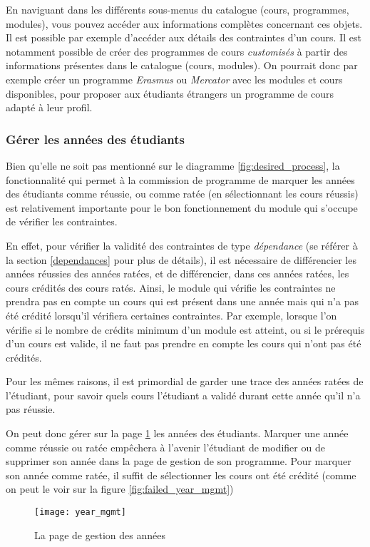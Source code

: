 En naviguant dans les différents sous-menus du catalogue (cours, programmes, modules), vous pouvez accéder aux informations complètes concernant ces objets. Il est possible par exemple d'accéder aux détails des contraintes d'un cours. Il est notamment possible de créer des programmes de cours \textit{customisés} à partir des informations présentes dans le catalogue (cours, modules). On pourrait donc par exemple créer un programme \textit{Erasmus} ou \textit{Mercator} avec les modules et cours disponibles, pour proposer aux étudiants étrangers un programme de cours adapté à leur profil.

\subsubsection{Gérer les années des étudiants}
\label{year_mgmt}
Bien qu'elle ne soit pas mentionné sur le diagramme \ref{fig:desired_process}, la fonctionnalité qui permet à la commission de programme de marquer les années des étudiants comme réussie, ou comme ratée (en sélectionnant les cours réussis) est relativement importante pour le bon fonctionnement du module qui s'occupe de vérifier les contraintes. 


En effet, pour vérifier la validité des contraintes de type \textit{dépendance} (se référer à  la section \ref{dependances} pour plus de détails), il est nécessaire de différencier les années réussies des années ratées, et de différencier, dans ces années ratées, les cours crédités des cours ratés. Ainsi, le module qui vérifie les contraintes ne prendra pas en compte un cours qui est présent dans une année mais qui n'a pas été crédité lorsqu'il vérifiera certaines contraintes. Par exemple, lorsque l'on vérifie si le nombre de crédits minimum d'un module est atteint, ou si le prérequis d'un cours est valide, il ne faut pas prendre en compte les cours qui n'ont pas été crédités. 

Pour les mêmes raisons, il est primordial de garder une trace des années ratées de l'étudiant, pour savoir quels cours l'étudiant a validé durant cette année qu'il n'a pas réussie.

On peut donc gérer sur la page \ref{fig:year_mgmt} les années des étudiants. Marquer une année comme réussie ou ratée empêchera à l'avenir l'étudiant de modifier ou de supprimer son année dans la page de gestion de son programme. Pour marquer son année comme ratée, il suffit de sélectionner les cours ont été crédité (comme on peut le voir sur la figure \ref{fig:failed_year_mgmt})
\begin{figure}[!htb]
\centering
\caption{La page de gestion des années}
\label{fig:year_mgmt}
\texttt{[image: year\_mgmt]}
\end{figure}

